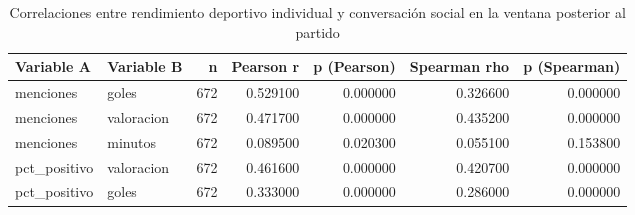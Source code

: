 \begin{table}
\caption{Correlaciones entre rendimiento deportivo individual y conversación social en la ventana posterior al partido}
\label{tab:correlaciones_jugador}
\begin{tabular}{llrrrrr}
\toprule
Variable A & Variable B & n & Pearson r & p (Pearson) & Spearman rho & p (Spearman) \\
\midrule
menciones & goles & 672 & 0.529100 & 0.000000 & 0.326600 & 0.000000 \\
menciones & valoracion & 672 & 0.471700 & 0.000000 & 0.435200 & 0.000000 \\
menciones & minutos & 672 & 0.089500 & 0.020300 & 0.055100 & 0.153800 \\
pct\_positivo & valoracion & 672 & 0.461600 & 0.000000 & 0.420700 & 0.000000 \\
pct\_positivo & goles & 672 & 0.333000 & 0.000000 & 0.286000 & 0.000000 \\
\bottomrule
\end{tabular}
\end{table}
